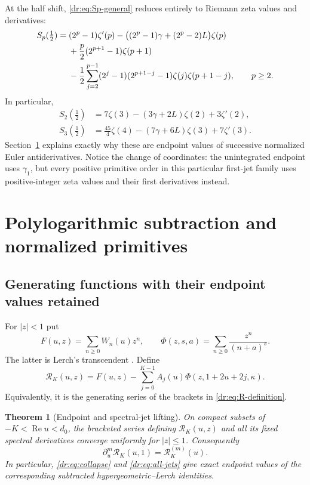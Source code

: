 \documentclass[11pt,letterpaper]{article}
\numberwithin{equation}{section}
\newtheorem{theorem}{Theorem}[section]
\theoremstyle{definition}
\theoremstyle{remark}
\DeclareMathOperator{\Rea}{Re}
\newcommand{\Rcal}{\mathcal R}
\begin{document}
At the half shift, \eqref{dr:eq:Sp-general} reduces entirely to Riemann
zeta values and derivatives:
\begin{align}
 S_p(\tfrac12)={}&(2^p-1)\zeta'(p)
 -\bigl((2^p-1)\gamma+(2^p-2)L\bigr)\zeta(p)\notag\\
 &+\frac p2(2^{p+1}-1)\zeta(p+1)\notag\\
 &-\frac12\sum_{j=2}^{p-1}(2^j-1)(2^{p+1-j}-1)
                       \zeta(j)\zeta(p+1-j),\qquad p\geq2.
 \label{dr:eq:Sp-half}
\end{align}
In particular,
\begin{align}
 S_2(\tfrac12)&=7\zeta(3)-(3\gamma+2L)\zeta(2)+3\zeta'(2),
       \label{dr:eq:S2-half}\\
 S_3(\tfrac12)&=\frac{45}{4}\zeta(4)
                   -(7\gamma+6L)\zeta(3)+7\zeta'(3).
       \label{dr:eq:S3-half}
\end{align}
Section~\ref{dr:sec:polylog} explains exactly why these are endpoint
values of successive normalized Euler antiderivatives. Notice the change
of coordinates: the unintegrated endpoint uses $\gamma_1$, but every
positive primitive order in this particular first-jet family uses
positive-integer zeta values and their first derivatives instead.

\section{Polylogarithmic subtraction and normalized primitives}
\label{dr:sec:polylog}

\subsection{Generating functions with their endpoint values retained}

For $|z|<1$ put
\begin{equation}
 F(u,z)=\sum_{n\geq0}W_n(u)z^n,
 \qquad
 \Phi(z,s,a)=\sum_{n\geq0}\frac{z^n}{(n+a)^s}.
 \label{dr:eq:F-Phi}
\end{equation}
The latter is Lerch's transcendent \cite{dlmf-lerch}. Define
\begin{equation}
 \Rcal_K(u,z)=F(u,z)-\sum_{j=0}^{K-1}
                    A_j(u)\Phi(z,1+2u+2j,\kappa).
 \label{dr:eq:Rz}
\end{equation}
Equivalently, it is the generating series of the brackets in
\eqref{dr:eq:R-definition}.

\begin{theorem}[Endpoint and spectral-jet lifting]
\label{dr:thm:endpoint}
On compact subsets of $-K<\Rea u<d_0$, the bracketed series defining
$\Rcal_K(u,z)$ and all its fixed spectral derivatives converge uniformly
for $|z|\leq1$. Consequently
\begin{equation}
 \partial_u^m\Rcal_K(u,1)=\Rcal_K^{(m)}(u).
 \label{dr:eq:endpoint}
\end{equation}
In particular, \eqref{dr:eq:collapse} and \eqref{dr:eq:all-jets} give
exact endpoint values of the corresponding subtracted hypergeometric--Lerch
identities.
\end{theorem}
\end{document}
